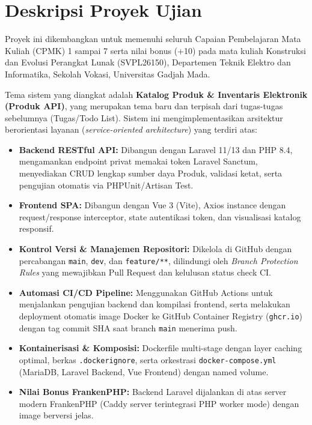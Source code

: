 \documentclass[a4paper,oneside,11pt]{book}
\begin{document}
\section{Deskripsi Proyek Ujian}
Proyek ini dikembangkan untuk memenuhi seluruh Capaian Pembelajaran Mata Kuliah (CPMK) 1 sampai 7 serta nilai bonus (+10) pada mata kuliah Konstruksi dan Evolusi Perangkat Lunak (SVPL26150), Departemen Teknik Elektro dan Informatika, Sekolah Vokasi, Universitas Gadjah Mada.

Tema sistem yang diangkat adalah \textbf{Katalog Produk \& Inventaris Elektronik (Produk API)}, yang merupakan tema baru dan terpisah dari tugas-tugas sebelumnya (Tugas/Todo List). Sistem ini mengimplementasikan arsitektur berorientasi layanan (\textit{service-oriented architecture}) yang terdiri atas:
\begin{itemize}
    \item \textbf{Backend RESTful API:} Dibangun dengan Laravel 11/13 dan PHP 8.4, mengamankan endpoint privat memakai token Laravel Sanctum, menyediakan CRUD lengkap sumber daya Produk, validasi ketat, serta pengujian otomatis via PHPUnit/Artisan Test.
    \item \textbf{Frontend SPA:} Dibangun dengan Vue 3 (Vite), Axios instance dengan request/response interceptor, state autentikasi token, dan visualisasi katalog responsif.
    \item \textbf{Kontrol Versi \& Manajemen Repositori:} Dikelola di GitHub dengan percabangan \texttt{main}, \texttt{dev}, dan \texttt{feature/**}, dilindungi oleh \textit{Branch Protection Rules} yang mewajibkan Pull Request dan kelulusan status check CI.
    \item \textbf{Automasi CI/CD Pipeline:} Menggunakan GitHub Actions untuk menjalankan pengujian backend dan kompilasi frontend, serta melakukan deployment otomatis image Docker ke GitHub Container Registry (\texttt{ghcr.io}) dengan tag commit SHA saat branch \texttt{main} menerima push.
    \item \textbf{Kontainerisasi \& Komposisi:} Dockerfile multi-stage dengan layer caching optimal, berkas \texttt{.dockerignore}, serta orkestrasi \texttt{docker-compose.yml} (MariaDB, Laravel Backend, Vue Frontend) dengan named volume.
    \item \textbf{Nilai Bonus FrankenPHP:} Backend Laravel dijalankan di atas server modern FrankenPHP (Caddy server terintegrasi PHP worker mode) dengan image berversi jelas.
\end{itemize}
\end{document}

